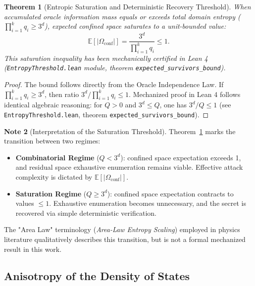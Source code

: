 \documentclass[11pt,a4paper]{article}
\theoremstyle{plain}
\newtheorem{teorema}{Theorem}[section]
\theoremstyle{definition}
\newtheorem{remark}[teorema]{Note}
\numberwithin{equation}{section}
\newcommand{\E}{\mathbb{E}}
\begin{document}
\begin{teorema}[Entropic Saturation and Deterministic Recovery Threshold]
\label{teo:ley_area_entropia}
When accumulated oracle information mass equals or exceeds total domain entropy ($\prod_{i=1}^k q_i \ge 3^d$), expected confined space saturates to a unit-bounded value:
\begin{equation}
\E[|\Omega_{\mathrm{conf}}|] = \frac{3^d}{\prod_{i=1}^k q_i} \le 1.
\end{equation}
This saturation inequality has been mechanically certified in Lean 4 (\texttt{EntropyThreshold.lean} module, theorem \texttt{expected\_survivors\_bound}).
\end{teorema}

\begin{proof}
The bound follows directly from the Oracle Independence Law. If $\prod_{i=1}^k q_i \ge 3^d$, then ratio $3^d / \prod_{i=1}^k q_i \le 1$. Mechanized proof in Lean 4 follows identical algebraic reasoning: for $Q > 0$ and $3^d \le Q$, one has $3^d / Q \le 1$ (see \texttt{EntropyThreshold.lean}, theorem \texttt{expected\_survivors\_bound}).
\end{proof}

\begin{remark}[Interpretation of the Saturation Threshold]
\label{rem:umbral_saturacion}
Theorem~\ref{teo:ley_area_entropia} marks the transition between two regimes:
\begin{itemize}
    \item \textbf{Combinatorial Regime} ($Q < 3^d$): confined space expectation exceeds 1, and residual space exhaustive enumeration remains viable. Effective attack complexity is dictated by $\E[|\Omega_{\mathrm{conf}}|]$.
    \item \textbf{Saturation Regime} ($Q \ge 3^d$): confined space expectation contracts to values $\le 1$. Exhaustive enumeration becomes unnecessary, and the secret is recovered via simple deterministic verification.
\end{itemize}
The "Area Law" terminology (\emph{Area-Law Entropy Scaling}) employed in physics literature qualitatively describes this transition, but is not a formal mechanized result in this work.
\end{remark}

\subsection{Anisotropy of the Density of States}
\label{subsec:anisotropia}
\end{document}

